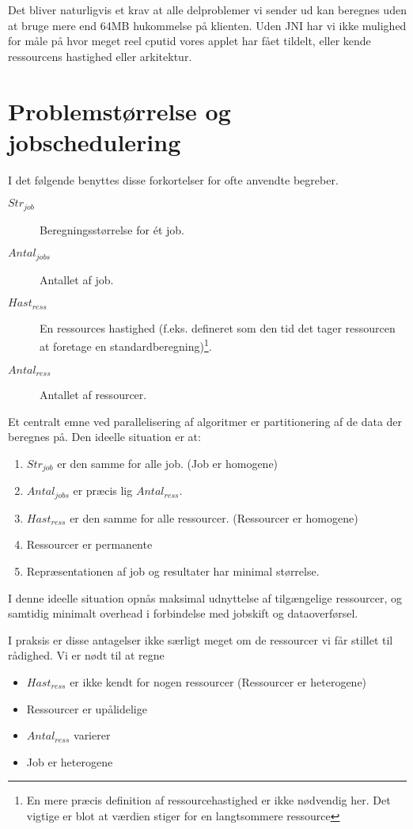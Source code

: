 \documentclass[pdf,draft,a4paper,11pt]{article}
\begin{document}
Det bliver naturligvis et krav at alle delproblemer vi sender ud kan beregnes uden at bruge mere end 64MB hukommelse på klienten. Uden JNI har vi ikke mulighed for måle på hvor meget reel cputid vores applet har fået tildelt, eller kende ressourcens hastighed eller arkitektur.   


\section{Problemstørrelse og jobschedulering}

I det følgende benyttes disse forkortelser for ofte anvendte begreber.
\begin{description}
	\item[$Str_{job}$] Beregningsstørrelse for ét job.
	\item[$Antal_{jobs}$] Antallet af job.
	\item[$Hast_{ress}$] En ressources hastighed (f.eks. defineret som den tid det tager ressourcen at foretage en standardberegning)\footnote{En mere præcis definition af ressourcehastighed er ikke nødvendig her. Det vigtige er blot at værdien stiger for en langtsommere ressource}.
	\item[$Antal_{ress}$] Antallet af ressourcer.  
\end{description}
Et centralt emne ved parallelisering af algoritmer er partitionering af de data der beregnes på. Den ideelle situation er at:
\begin{enumerate}
	\item $Str_{job}$ er den samme for alle job. (Job er homogene) \label{beregningstid}
	\item $Antal_{jobs}$ er præcis lig $Antal_{ress}$.\label{antal}
	\item $Hast_{ress}$ er den samme for alle ressourcer. (Ressourcer er homogene) 
	\item Ressourcer er permanente
	\item Repræsentationen af job og resultater har minimal størrelse.\label{jobbeskrivelse}
\end{enumerate}

I denne ideelle situation opnås maksimal udnyttelse af tilgængelige ressourcer, og samtidig minimalt overhead i forbindelse med jobskift og dataoverførsel.

I praksis er disse antagelser ikke særligt meget om de ressourcer vi får stillet til rådighed. Vi er nødt til at regne  
\begin{itemize}
	\item $Hast_{ress}$ er ikke kendt for nogen ressourcer (Ressourcer er heterogene)  
	\item Ressourcer er upålidelige
	\item $Antal_{ress}$ varierer
	\item Job er heterogene
\end{itemize}
\end{document}
